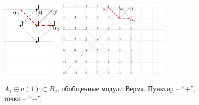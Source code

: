 \documentclass[pdftex]{beamer}
\newcommand{\gf}{\mathfrak{g}}
\newcommand{\af}{\mathfrak{a}}
\newcommand{\pf}{\mathfrak{p}}
\theoremstyle{definition} \newtheorem{Def}{Определение}
\begin{document}
\begin{frame}
\begin{columns}
  \end{columns}
  \begin{figure}[t]
    \vspace*{-0.2cm}
      \hfill
        \includegraphics[width=30mm]{figures/B2-irrep}
        \includegraphics[width=55mm]{figures/B2_Gen_Verma_Decomp}
      \hfill
    \vspace*{-0.3cm}
      \caption{$A_{1}\oplus u(1) \subset B_{2}$, обобщенные модули Верма.
        Пунктир -- ``$+$'', точки -- ``$-$''.}
  \end{figure}
\end{frame}
\end{document}
